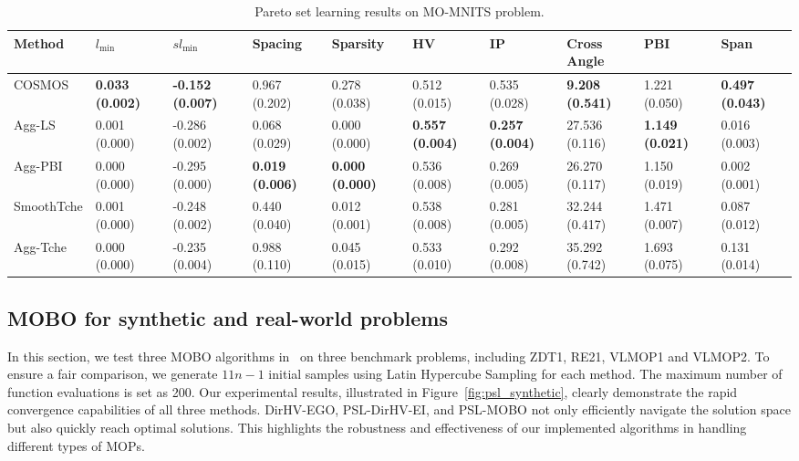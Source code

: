 \begin{table}[]
\tiny
\caption{Pareto set learning results on MO-MNITS problem.}
\label{tab:psl_mtl}

\setlength\tabcolsep{2.0 pt}
\centering
\begin{tabular}{l|l|l|l|l|l|l|l|l|l}
\toprule
Method & $l_\mathrm{min}$ & $sl_\mathrm{min}$ & Spacing & Sparsity & HV                & IP & Cross Angle & PBI & Span \\
\midrule
COSMOS                     & \textbf{0.033 (0.002)}     & \textbf{-0.152 (0.007)}     & 0.967 (0.202)              & 0.278 (0.038)              & 0.512 (0.015)              & 0.535 (0.028)              & \textbf{9.208 (0.541)}     & 1.221 (0.050)              & \textbf{0.497 (0.043)}     \\ 
Agg-LS                         & 0.001 (0.000)              & -0.286 (0.002)              & 0.068 (0.029)              & 0.000 (0.000)              & \textbf{0.557 (0.004)}     & \textbf{0.257 (0.004)}     & 27.536 (0.116)             & \textbf{1.149 (0.021)}     & 0.016 (0.003)              \\ 
Agg-PBI                        & 0.000 (0.000)              & -0.295 (0.000)              & \textbf{0.019 (0.006)}     & \textbf{0.000 (0.000)}     & 0.536 (0.008)              & 0.269 (0.005)              & 26.270 (0.117)             & 1.150 (0.019)              & 0.002 (0.001)              \\ 
SmoothTche                   & 0.001 (0.000)              & -0.248 (0.002)              & 0.440 (0.040)              & 0.012 (0.001)              & 0.538 (0.008)              & 0.281 (0.005)              & 32.244 (0.417)             & 1.471 (0.007)              & 0.087 (0.012)              \\ 
Agg-Tche                       & 0.000 (0.000)              & -0.235 (0.004)              & 0.988 (0.110)              & 0.045 (0.015)              & 0.533 (0.010)              & 0.292 (0.008)              & 35.292 (0.742)             & 1.693 (0.075)              & 0.131 (0.014) \\
\bottomrule
\end{tabular}
\end{table}

\subsection{MOBO for synthetic and real-world problems}
In this section, we test three MOBO algorithms in \algoname~on three benchmark problems, including ZDT1, RE21, VLMOP1 and VLMOP2. To ensure a fair comparison, we generate $11n-1$ initial samples using Latin Hypercube Sampling for each method. The maximum number of function evaluations is set as 200.
Our experimental results, illustrated in Figure~\ref{fig:psl_synthetic}, clearly demonstrate the rapid convergence capabilities of all three methods. DirHV-EGO, PSL-DirHV-EI, and PSL-MOBO not only efficiently navigate the solution space but also quickly reach optimal solutions. This highlights the robustness and effectiveness of our implemented algorithms in handling different types of MOPs.

